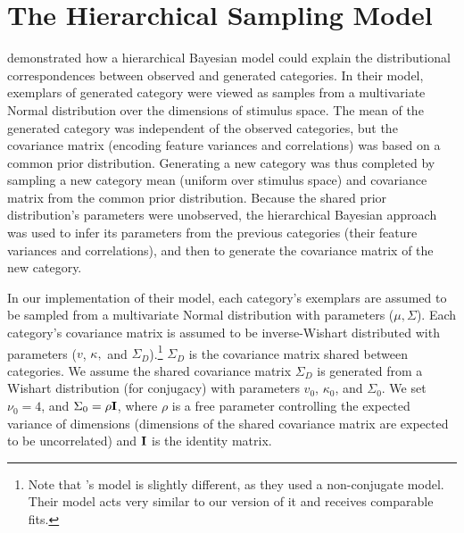 \documentclass[12pt]{article}
\newcommand\nbcnote[1]{\todo[inline, backgroundcolor = yellow]{\textbf{NBC}: #1}}
\begin{document}
\clearpage

\appendix
{}

\section{The Hierarchical Sampling Model}
\label{ap:hsampling-definition}

\cite{jern2013probabilistic} demonstrated how a hierarchical Bayesian model could explain the distributional correspondences between observed and generated categories. In their model, exemplars of generated category were viewed as samples from a multivariate Normal distribution over the dimensions of stimulus space. The mean of the generated category was independent of the observed categories, but the covariance matrix (encoding feature variances and correlations) was based on a common prior distribution. Generating a new category was thus completed by sampling a new category mean (uniform over stimulus space) and covariance matrix from the common prior distribution. Because the shared prior distribution's parameters were unobserved, the hierarchical Bayesian approach was used to infer its parameters from the previous categories (their feature variances and correlations), and then to generate the covariance matrix of the new category.

In our implementation of their model, each category's exemplars are assumed to be sampled from a multivariate Normal distribution with parameters ($\mu, \Sigma$). Each category's covariance matrix is assumed to be inverse-Wishart distributed with parameters ($v$, $\kappa,$ and $\Sigma_D$).\footnote{Note that \citet{jern2013probabilistic}'s model is slightly different, as they used a non-conjugate model. Their model acts very similar to our version of it and receives comparable fits.} $\Sigma_D$ is the covariance matrix shared between categories. We assume the shared covariance matrix $\Sigma_D$ is generated from a Wishart distribution (for conjugacy) with parameters $v_0$, $\kappa_0$, and $\Sigma_0$. We set $\nu_0 = 4$, and $\Sigma_0 = \rho {\bf I}$, where $\rho$ is a free parameter controlling the expected variance of dimensions (dimensions of the shared covariance matrix are expected to be uncorrelated) and ${\bf I}$ is the identity matrix.

\nbcnote{check on that $\nu_0 = 4$ business}
\end{document}
